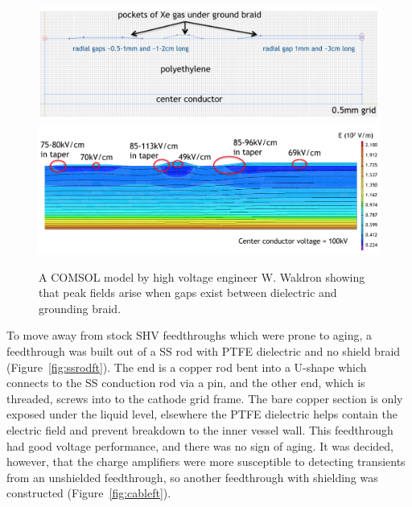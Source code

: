 \begin{figure}[htbp]
\begin{center}
\includegraphics[width=\textwidth]{figures/testbed/will_comsol_1.png}\\
\includegraphics[width=\textwidth]{figures/testbed/will_comsol_2.png}

\caption{A COMSOL model by high voltage engineer W. Waldron showing that peak fields arise when gaps exist between dielectric and grounding braid.}
\label{fig:will_comsol}
\end{center}
\end{figure}

To move away from stock SHV feedthroughs which were prone to aging, a feedthrough was built out of a \ac{SS} rod with \ac{PTFE} dielectric and no shield braid (Figure~\ref{fig:ssrodft}). The end is a copper rod bent into a U-shape which connects to the \ac{SS} conduction rod via a pin, and the other end, which is threaded, screws into to the cathode grid frame. The bare copper section is only exposed under the liquid level, elsewhere the \ac{PTFE} dielectric helps contain the electric field and prevent breakdown to the inner vessel wall. This feedthrough had good voltage performance, and there was no sign of aging. It was decided, however, that the charge amplifiers were more susceptible to detecting transients from an unshielded feedthrough, so another feedthrough with shielding was constructed (Figure~\ref{fig:cableft}).

